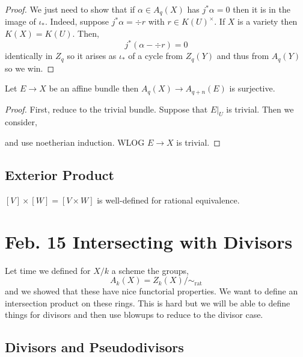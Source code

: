 \documentclass[12pt]{article}
\begin{document}
\begin{proof}
We just need to show that if $\alpha \in A_q(X)$ has $j^* \alpha = 0$ then it is in the image of $\iota_*$. Indeed, suppose $j^* \alpha = \div{r}$ with $r \in K(U)^\times$. If $X$ is a variety then $K(X) = K(U)$. Then,
\[ j^* (\alpha - \div{r}) = 0 \]
identically in $Z_q$ so it arises as $\iota_*$ of a cycle from $Z_q(Y)$ and thus from $A_q(Y)$ so we win.
\end{proof}

\begin{theorem}
Let $E \to X$ be an affine bundle then $A_q(X) \to A_{q+n}(E)$ is surjective.
\end{theorem}

\begin{proof}
First, reduce to the trivial bundle. Suppose that $E|_U$ is trivial. Then we consider,
\begin{center}
\end{center}
and use noetherian induction. 
WLOG $E \to X$ is trivial. 
\end{proof}


\subsection{Exterior Product}

$[V] \times [W] = [V \times W]$ is well-defined for rational equivalence. 

\section{Feb. 15 Intersecting with Divisors}

Let time we defined for $X / k$ a scheme the groups,
\[ A_k(X) = Z_k(X) / \sim_{\text{rat}} \]
and we showed that these have nice functorial properties. We want to define an intersection product on these rings. This is hard but we will be able to define things for divisors and then use blowups to reduce to the divisor case.

\subsection{Divisors and Pseudodivisors}
\end{document}
